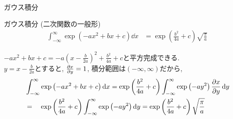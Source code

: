 \documentclass[dvipdfmx,notheorems,t]{beamer}
\begin{document}
\begin{frame}{ガウス積分}
\begin{block}{ガウス積分 (二次関数の一般形)}
  \begin{align*}
    \int_{-\infty}^\infty \exp \left( -a x^2 + bx + c \right) \dd{x}
      &= \exp \left( \frac{b^2}{4a} + c \right) \sqrt{\frac{\pi}{a}}
  \end{align*}
\end{block}

$-a x^2 + bx + c = -a \left( x - \frac{b}{2a} \right)^2 + \frac{b^2}{4a} + c$と平方完成できる. \\
$y = x - \frac{b}{2a}$とすると, $\pdv{x}{y} = 1$, 積分範囲は$(-\infty, \infty)$だから,
\begin{align*}
  & \int_{-\infty}^\infty \exp \left( -a x^2 + bx + c \right) \dd{x}
    = \exp \left( \frac{b^2}{4a} + c \right)
      \int_{-\infty}^\infty \exp \left( -a y^2 \right) \pdv{x}{y} \dd{y} \\
    &= \quad \exp \left( \frac{b^2}{4a} + c \right)
      \int_{-\infty}^\infty \exp \left( -a y^2 \right) \dd{y}
    = \exp \left( \frac{b^2}{4a} + c \right) \sqrt{\frac{\pi}{a}}
\end{align*}
\end{frame}
\end{document}
